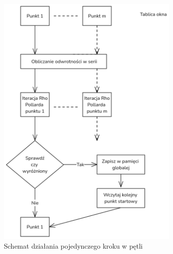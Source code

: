 \begin{figure}[H]
    \centering
    \includegraphics[width=0.8\textwidth]{img/okienkowanie_3.png}
    \caption{Schemat działania pojedynczego kroku w pętli}
    \label{fig:windowing}
\end{figure}

